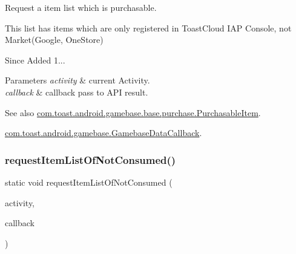 Request a item list which is purchasable. 

This list has items which are only registered in Toast\+Cloud I\+AP Console, not Market(\+Google, One\+Store)

\begin{DoxySince}{Since}
Added 1... 
\end{DoxySince}

\begin{DoxyParams}{Parameters}
{\em activity} & current Activity. \\
\hline
{\em callback} & callback pass to A\+PI result. \\
\hline
\end{DoxyParams}
\begin{DoxySeeAlso}{See also}
\hyperlink{classcom_1_1toast_1_1android_1_1gamebase_1_1base_1_1purchase_1_1_purchasable_item}{com.\+toast.\+android.\+gamebase.\+base.\+purchase.\+Purchasable\+Item}. 

\hyperlink{interfacecom_1_1toast_1_1android_1_1gamebase_1_1_gamebase_data_callback}{com.\+toast.\+android.\+gamebase.\+Gamebase\+Data\+Callback}. 
\end{DoxySeeAlso}
\mbox{\label{classcom_1_1toast_1_1android_1_1gamebase_1_1_gamebase_1_1_purchase_a335f00febc88c2052a9914278aebdac0}} 
\subsubsection{\texorpdfstring{request\+Item\+List\+Of\+Not\+Consumed()}{requestItemListOfNotConsumed()}}
{\footnotesize\ttfamily static void request\+Item\+List\+Of\+Not\+Consumed (\begin{DoxyParamCaption}\item[{@Non\+Null final Activity}]{activity,  }\item[{@Non\+Null final \hyperlink{interfacecom_1_1toast_1_1android_1_1gamebase_1_1_gamebase_data_callback}{Gamebase\+Data\+Callback}$<$ List$<$ \hyperlink{classcom_1_1toast_1_1android_1_1gamebase_1_1base_1_1purchase_1_1_purchasable_receipt}{Purchasable\+Receipt} $>$$>$}]{callback }\end{DoxyParamCaption})\hspace{0.3cm}{\ttfamily [static]}}



